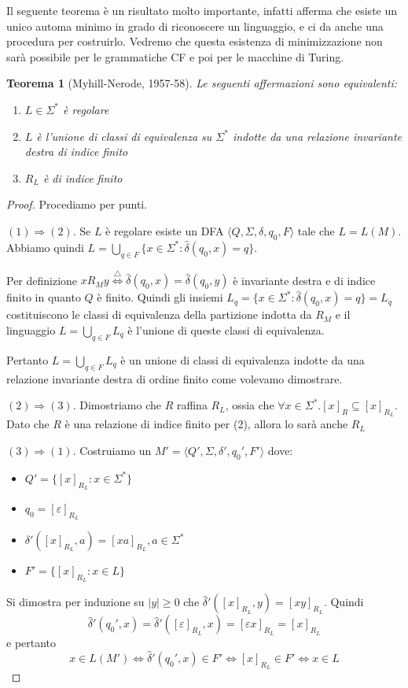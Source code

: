 \documentclass[a4paper,titlepage]{article}
\newtheorem{theorem}{Teorema}[section]
\theoremstyle{definition}
\newcommand{\DFA}{\langle Q,\Sigma,\delta,q_0,F\rangle}
\begin{document}
Il seguente teorema è un risultato molto importante, infatti afferma che esiste un unico automa minimo in grado di riconoscere un linguaggio, e ci da anche una procedura per costruirlo. Vedremo che questa esistenza di minimizzazione non sarà possibile per le grammatiche CF e poi per le macchine di Turing. 
\begin{theorem}[Myhill-Nerode, 1957-58]
	Le seguenti affermazioni sono equivalenti:
	\begin{enumerate}[(1)]
		\item $L \in \Sigma^*$ è regolare
		\item $L$ è l'unione di classi di equivalenza su $\Sigma^*$ indotte da una relazione invariante destra di indice finito
		\item $R_L$ è di indice finito
	\end{enumerate}
\end{theorem}
\begin{proof}
	Procediamo per punti. 
	
	$(1)\Rightarrow(2)$. Se $L$ è regolare esiste un DFA $\DFA$ tale che $L=L(M)$. Abbiamo quindi $L=\bigcup_{q\in F} \{x\in\Sigma^*:\hat\delta(q_0,x)=q\}$.
	
	Per definizione $xR_My \stackrel{\triangle}{\iff}\hat\delta(q_0,x)=\hat\delta(q_0,y)$ è invariante destra e di indice finito in quanto $Q$ è finito. Quindi gli insiemi $L_q =\{x\in\Sigma^*:\hat\delta(q_0,x)=q\} = L_q$ costituiscono le classi di equivalenza della partizione indotta da $R_M$ e  il linguaggio $L=\bigcup_{q\in F}L_q$ è l'unione di queste classi di equivalenza. 
	
	Pertanto $L=\bigcup_{q\in F}L_q$ è un unione di classi di equivalenza indotte da una relazione invariante destra di ordine finito come volevamo dimostrare. 
	
	$(2)\Rightarrow(3)$. Dimostriamo che $R$ raffina $R_L$, ossia che $\forall x\in\Sigma^*.[x]_R\subseteq[x]_{R_L}$. Dato che $R$ è una relazione di indice finito per (2), allora lo sarà anche $R_L$
	
	$(3)\Rightarrow(1)$. Costruiamo un $M'=\langle Q',\Sigma,\delta',q_0',F'\rangle$ dove:
	\begin{itemize}
		\item $Q' = \{[x]_{R_L}:x\in\Sigma^*\}$
		\item $q_0 = [\varepsilon]_{R_L}$
		\item $\delta'([x]_{R_L}, a) = [xa]_{R_L}, a\in\Sigma^*$
		\item $F'=\{[x]_{R_L}:x\in L\}$ 
	\end{itemize}

	Si dimostra per induzione su $|y|\geq0$ che $\hat\delta'([x]_{R_L},y)=[xy]_{R_L}$. Quindi
	\[
		\hat\delta'(q_0',x)=\hat\delta'([\varepsilon]_{R_L},x)=[\varepsilon x]_{R_L}=[x]_{R_L}
	\] 
	e pertanto 
	\[
		x\in L(M')\iff\hat\delta'(q_0',x)\in F'\iff [x]_{R_L}\in F' \iff x \in L
	\]
\end{proof}
\end{document}

